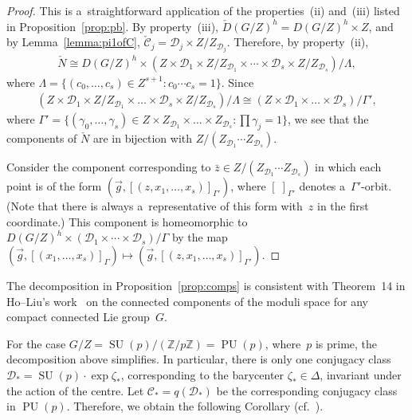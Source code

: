 \documentclass[11pt]{article}
\numberwithin{equation}{section}
\DeclareMathOperator{\SU}{SU}
\DeclareMathOperator{\PU}{PU}
\begin{document}
\begin{proof}
This is a~straightforward application of the properties~(ii) %
and~(iii) %
listed in Proposition~\ref{prop:pb}.
By property~(iii), $\check{D}(G/Z)^h = D(G/Z)^h \times Z$, and by Lemma~\ref{lemma:pi1ofC},
$\check{\mathcal{C}}_j = \mathcal{D}_j \times Z/Z_{\mathcal{D}_j}$.
Therefore, by property~(ii),
\begin{gather*}
\check{N} \cong D(G/Z)^h \times (Z\times \mathcal{D}_1 \times Z/Z_{\mathcal{D}_1} \times \cdots \times \mathcal{D}_s
\times Z/Z_{\mathcal{D}_s})/\Lambda,
\end{gather*}
where $\Lambda={\{(c_0, \ldots, c_{s}) \in Z^{s+1} \colon c_0 \cdots c_{s}=1\}}$.
Since
\begin{gather*}
(Z\times \mathcal{D}_1 \times Z/Z_{\mathcal{D}_1} \times \dots \times \mathcal{D}_s \times Z/Z_{\mathcal{D}_s})/\Lambda
\cong (Z\times \mathcal{D}_1 \times \dots \times \mathcal{D}_s)/\Gamma',
\end{gather*}
where $\Gamma'=\{(\gamma_0, \ldots, \gamma_{s}) \in Z\times Z_{\mathcal{D}_1} \times \dots \times Z_{\mathcal{D}_s}
\colon \prod \gamma_j =1\}$, we see that the components of $\check{N}$ are in bijection with $Z/(Z_{\mathcal{D}_1} \cdots
Z_{\mathcal{D}_s})$.

Consider the component corresponding to $\bar{z} \in Z/(Z_{\mathcal{D}_1}\cdots Z_{\mathcal{D}_s})$ in which each point
is of the form $(\vec{g},[(z,x_1, \ldots, x_s)]_{\Gamma'})$, where $[\;]_{\Gamma'}$
denotes a~$\Gamma'$-orbit.
(Note that there is always a~representative of this form with~$z$ in the f\/irst coordinate.) This component is
homeomorphic to $D(G/Z)^h \times (\mathcal{D}_1 \times \cdots \times \mathcal{D}_s)/\Gamma$ by the map $(\vec{g},[(x_1, \ldots,
x_s)]_{\Gamma}) \mapsto (\vec{g},[(z,x_1, \ldots, x_s)]_{\Gamma'})$.
\end{proof}

\begin{Remark}
The decomposition in Proposition~\ref{prop:comps} is consistent with Theorem~14 in Ho--Liu's work~\cite{HL} on the
connected components of the moduli space for any compact connected Lie group~$G$.
\end{Remark}

For the case $G/Z=\SU(p)/({\mathbb{Z}}/p{\mathbb{Z}})=\PU(p)$, where~$p$ is prime, the decomposition above simplif\/ies.
In particular, there is only one conjugacy class $\mathcal{D}_*=\SU(p) \cdot \exp \zeta_*$, corresponding to the
barycenter $\zeta_* \in \Delta$, invariant under the action of the centre.
Let $\mathcal{C}_*=q(\mathcal{D}_*)$ be the corresponding conjugacy class in $\PU(p)$.
Therefore, we obtain the following Corollary (cf.~\cite[Lemma 2.3]{KM}).
\end{document}
